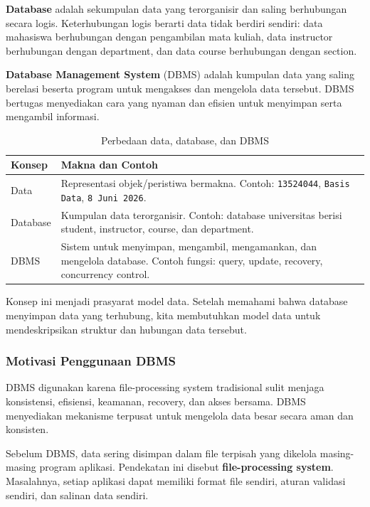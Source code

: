 \textbf{Database} adalah sekumpulan data yang terorganisir dan saling berhubungan secara logis. Keterhubungan logis berarti data tidak berdiri sendiri: data mahasiswa berhubungan dengan pengambilan mata kuliah, data instructor berhubungan dengan department, dan data course berhubungan dengan section.

\textbf{Database Management System} (DBMS) adalah kumpulan data yang saling berelasi beserta program untuk mengakses dan mengelola data tersebut. DBMS bertugas menyediakan cara yang nyaman dan efisien untuk menyimpan serta mengambil informasi.

\begin{table}[H]
\centering
\begin{tabularx}{\textwidth}{|L{0.22\textwidth}|X|}
\hline
\textbf{Konsep} & \textbf{Makna dan Contoh} \\
\hline
Data & Representasi objek/peristiwa bermakna. Contoh: \texttt{13524044}, \texttt{Basis Data}, \texttt{8 Juni 2026}. \\
\hline
Database & Kumpulan data terorganisir. Contoh: database universitas berisi student, instructor, course, dan department. \\
\hline
DBMS & Sistem untuk menyimpan, mengambil, mengamankan, dan mengelola database. Contoh fungsi: query, update, recovery, concurrency control. \\
\hline
\end{tabularx}
\caption{Perbedaan data, database, dan DBMS}
\label{tab:data-database-dbms}
\end{table}

Konsep ini menjadi prasyarat model data. Setelah memahami bahwa database menyimpan data yang terhubung, kita membutuhkan model data untuk mendeskripsikan struktur dan hubungan data tersebut.

\subsubsection{Motivasi Penggunaan DBMS}

\begin{jawab}
DBMS digunakan karena file-processing system tradisional sulit menjaga konsistensi, efisiensi, keamanan, recovery, dan akses bersama. DBMS menyediakan mekanisme terpusat untuk mengelola data besar secara aman dan konsisten.
\end{jawab}

Sebelum DBMS, data sering disimpan dalam file terpisah yang dikelola masing-masing program aplikasi. Pendekatan ini disebut \textbf{file-processing system}. Masalahnya, setiap aplikasi dapat memiliki format file sendiri, aturan validasi sendiri, dan salinan data sendiri.

